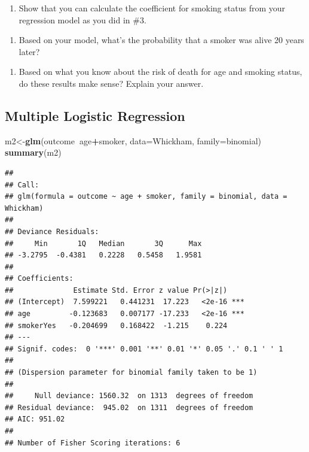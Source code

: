 \documentclass[]{article}
\newenvironment{Shaded}{\begin{snugshade}}{\end{snugshade}}
\newcommand{\DataTypeTok}[1]{\textcolor[rgb]{0.13,0.29,0.53}{#1}}
\newcommand{\KeywordTok}[1]{\textcolor[rgb]{0.13,0.29,0.53}{\textbf{#1}}}
\newcommand{\NormalTok}[1]{#1}
\newcommand{\OperatorTok}[1]{\textcolor[rgb]{0.81,0.36,0.00}{\textbf{#1}}}
\providecommand{\tightlist}{%
  \setlength{\itemsep}{0pt}\setlength{\parskip}{0pt}}
\begin{document}
\begin{enumerate}
\def\labelenumi{\arabic{enumi}.}
\setcounter{enumi}{3}
\tightlist
\item
  Show that you can calculate the coefficient for smoking status from
  your regression model as you did in \#3.
\end{enumerate}

\vspace{3in}

\begin{enumerate}
\def\labelenumi{\arabic{enumi}.}
\setcounter{enumi}{4}
\tightlist
\item
  Based on your model, what's the probability that a smoker was alive 20
  years later?
\end{enumerate}

\vspace{3in}

\begin{enumerate}
\def\labelenumi{\arabic{enumi}.}
\setcounter{enumi}{5}
\tightlist
\item
  Based on what you know about the risk of death for age and smoking
  status, do these results make sense? Explain your answer.
\end{enumerate}

\newpage

\hypertarget{multiple-logistic-regression}{%
\subsection{Multiple Logistic
Regression}\label{multiple-logistic-regression}}

\begin{Shaded}
\begin{Highlighting}[]
\NormalTok{m2<-}\KeywordTok{glm}\NormalTok{(outcome}\OperatorTok{~}\NormalTok{age}\OperatorTok{+}\NormalTok{smoker, }\DataTypeTok{data=}\NormalTok{Whickham, }\DataTypeTok{family=}\NormalTok{binomial)}
\KeywordTok{summary}\NormalTok{(m2)}
\end{Highlighting}
\end{Shaded}

\begin{verbatim}
## 
## Call:
## glm(formula = outcome ~ age + smoker, family = binomial, data = Whickham)
## 
## Deviance Residuals: 
##     Min       1Q   Median       3Q      Max  
## -3.2795  -0.4381   0.2228   0.5458   1.9581  
## 
## Coefficients:
##              Estimate Std. Error z value Pr(>|z|)    
## (Intercept)  7.599221   0.441231  17.223   <2e-16 ***
## age         -0.123683   0.007177 -17.233   <2e-16 ***
## smokerYes   -0.204699   0.168422  -1.215    0.224    
## ---
## Signif. codes:  0 '***' 0.001 '**' 0.01 '*' 0.05 '.' 0.1 ' ' 1
## 
## (Dispersion parameter for binomial family taken to be 1)
## 
##     Null deviance: 1560.32  on 1313  degrees of freedom
## Residual deviance:  945.02  on 1311  degrees of freedom
## AIC: 951.02
## 
## Number of Fisher Scoring iterations: 6
\end{verbatim}
\end{document}
